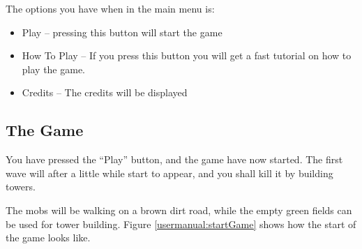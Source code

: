 The options you have when in the main menu is:

\begin{itemize}
	\item Play -- pressing this button will start the game
	\item How To Play -- If you press this button you will get a fast tutorial on how to play the game.
	\item Credits -- The credits will be displayed
\end{itemize}



\subsection{The Game}
You have pressed the “Play” button, and the game have now started. The first wave will after a little while start to appear, and you shall kill it by building towers.

The mobs will be walking on a brown dirt road, while the empty green fields can be used for tower building. Figure \ref{usermanual:startGame} shows how the start of the game looks like.

